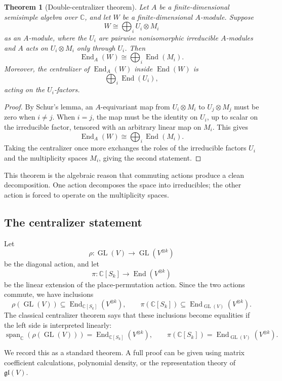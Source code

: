 \documentclass[12pt,a4paper]{article}
\newtheorem{theorem}{Theorem}[section]
\theoremstyle{definition}
\theoremstyle{remark}
\newcommand{\C}{\mathbb{C}}
\newcommand{\GL}{\operatorname{GL}}
\newcommand{\End}{\operatorname{End}}
\newcommand{\Span}{\operatorname{span}}
\begin{document}
\begin{theorem}[Double-centralizer theorem]
Let \(A\) be a finite-dimensional semisimple algebra over \(\C\), and let
\(W\) be a finite-dimensional \(A\)-module.  Suppose
\[
W\cong \bigoplus_i U_i\otimes M_i
\]
as an \(A\)-module, where the \(U_i\) are pairwise nonisomorphic irreducible
\(A\)-modules and \(A\) acts on \(U_i\otimes M_i\) only through \(U_i\).
Then
\[
\End_A(W)\cong \bigoplus_i \End(M_i).
\]
Moreover, the centralizer of \(\End_A(W)\) inside \(\End(W)\) is
\[
\bigoplus_i \End(U_i),
\]
acting on the \(U_i\)-factors.
\end{theorem}

\begin{proof}
By Schur's lemma, an \(A\)-equivariant map from \(U_i\otimes M_i\) to
\(U_j\otimes M_j\) must be zero when \(i\ne j\).  When \(i=j\), the map must
be the identity on \(U_i\), up to scalar on the irreducible factor, tensored
with an arbitrary linear map on \(M_i\).  This gives
\[
\End_A(W)\cong \bigoplus_i \End(M_i).
\]
Taking the centralizer once more exchanges the roles of the irreducible
factors \(U_i\) and the multiplicity spaces \(M_i\), giving the second
statement.
\end{proof}

This theorem is the algebraic reason that commuting actions produce a clean
decomposition.  One action decomposes the space into irreducibles; the other
action is forced to operate on the multiplicity spaces.

\subsection{The centralizer statement}

Let
\[
\rho:\GL(V)\to \GL(V^{\otimes k})
\]
be the diagonal action, and let
\[
\pi:\C[S_k]\to \End(V^{\otimes k})
\]
be the linear extension of the place-permutation action.  Since the two
actions commute, we have inclusions
\[
\rho(\GL(V))\subseteq \End_{\C[S_k]}(V^{\otimes k}),
\qquad
\pi(\C[S_k])\subseteq \End_{\GL(V)}(V^{\otimes k}).
\]
The classical centralizer theorem says that these inclusions become
equalities if the left side is interpreted linearly:
\[
\Span_\C(\rho(\GL(V)))=\End_{\C[S_k]}(V^{\otimes k}),
\qquad
\pi(\C[S_k])=\End_{\GL(V)}(V^{\otimes k}).
\]

We record this as a standard theorem.  A full proof can be given using
matrix coefficient calculations, polynomial density, or the representation
theory of \(\mathfrak{gl}(V)\).
\end{document}
